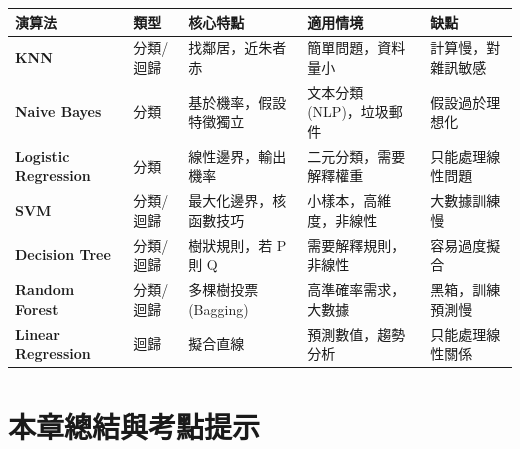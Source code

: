 \documentclass[
  letterpaper,
  DIV=11,
  numbers=noendperiod]{scrreprt}
\begin{document}
\begin{longtable}[]{@{}
  >{\raggedright\arraybackslash}p{}
  >{\raggedright\arraybackslash}p{}
  >{\raggedright\arraybackslash}p{}
  >{\raggedright\arraybackslash}p{}
  >{\raggedright\arraybackslash}p{}@{}}
\toprule\noalign{}
\begin{minipage}[b]{\linewidth}\raggedright
演算法
\end{minipage} & \begin{minipage}[b]{\linewidth}\raggedright
類型
\end{minipage} & \begin{minipage}[b]{\linewidth}\raggedright
核心特點
\end{minipage} & \begin{minipage}[b]{\linewidth}\raggedright
適用情境
\end{minipage} & \begin{minipage}[b]{\linewidth}\raggedright
缺點
\end{minipage} \\
\midrule\noalign{}
\endhead
\bottomrule\noalign{}
\endlastfoot
\textbf{KNN} & 分類/迴歸 & 找鄰居，近朱者赤 & 簡單問題，資料量小 &
計算慢，對雜訊敏感 \\
\textbf{Naive Bayes} & 分類 & 基於機率，假設特徵獨立 & 文本分類
(NLP)，垃圾郵件 & 假設過於理想化 \\
\textbf{Logistic Regression} & 分類 & 線性邊界，輸出機率 &
二元分類，需要解釋權重 & 只能處理線性問題 \\
\textbf{SVM} & 分類/迴歸 & 最大化邊界，核函數技巧 &
小樣本，高維度，非線性 & 大數據訓練慢 \\
\textbf{Decision Tree} & 分類/迴歸 & 樹狀規則，若 P 則 Q &
需要解釋規則，非線性 & 容易過度擬合 \\
\textbf{Random Forest} & 分類/迴歸 & 多棵樹投票 (Bagging) &
高準確率需求，大數據 & 黑箱，訓練預測慢 \\
\textbf{Linear Regression} & 迴歸 & 擬合直線 & 預測數值，趨勢分析 &
只能處理線性關係 \\
\end{longtable}

\chapter{本章總結與考點提示}\label{chap-chapter5-summary}
\end{document}
